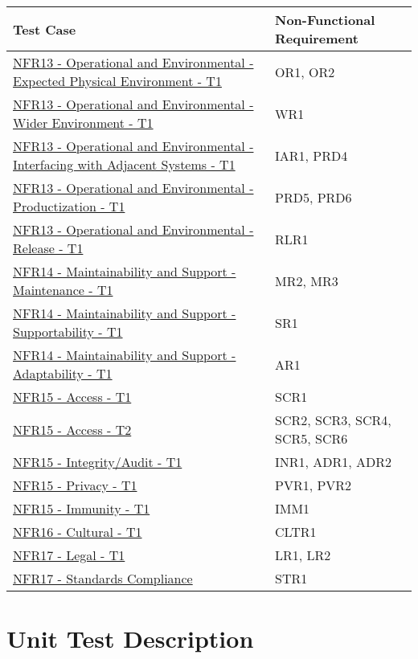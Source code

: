 \documentclass[12pt, titlepage]{article}
\begin{document}
\begin{tabularx}{\textwidth}{p{7cm}p{7cm}}
\toprule {\bf Test Case} & {\bf Non-Functional Requirement}\\
\midrule
\hyperlink{NFR13.1-TC1}{NFR13 - Operational and Environmental - Expected Physical Environment - T1} & {OR1, OR2} \\
\hyperlink{NFR13.2-TC1}{NFR13 - Operational and Environmental - Wider Environment - T1} & {WR1} \\
\hyperlink{NFR13.3-TC1}{NFR13 - Operational and Environmental - Interfacing with Adjacent Systems - T1 } & {IAR1, PRD4} \\
\hyperlink{NFR13.4-TC1}{NFR13 - Operational and Environmental - Productization - T1} & {PRD5, PRD6} \\
\hyperlink{NFR13.5-TC1}{NFR13 - Operational and Environmental - Release - T1} & {RLR1} \\
\hyperlink{NFR14.1-TC1}{NFR14 - Maintainability and Support - Maintenance - T1} & {MR2, MR3} \\
\hyperlink{NFR14.2-TC1}{NFR14 - Maintainability and Support - Supportability - T1} & {SR1} \\
\hyperlink{NFR14.3-TC1}{NFR14 - Maintainability and Support - Adaptability - T1} & {AR1} \\
\hyperlink{NFR15.1-TC1}{NFR15 - Access - T1} & {SCR1} \\
\hyperlink{NFR15.1-TC2}{NFR15 - Access - T2} & {SCR2, SCR3, SCR4, SCR5, SCR6} \\
\hyperlink{NFR15.2-TC1}{NFR15 - Integrity/Audit - T1} & {INR1, ADR1, ADR2} \\
\hyperlink{NFR15.3-TC1}{NFR15 - Privacy - T1} & {PVR1, PVR2} \\
\hyperlink{NFR15.4-TC1}{NFR15 - Immunity - T1} & {IMM1} \\
\hyperlink{NFR16.1-TC1}{NFR16 - Cultural - T1} & {CLTR1} \\
\hyperlink{NFR17.1-TC1}{NFR17 - Legal - T1} & {LR1, LR2} \\
\hyperlink{NFR17.2-TC1}{NFR17 - Standards Compliance} & {STR1}\\
\bottomrule
\end{tabularx}

\newpage
\section{Unit Test Description}

\end{document}
